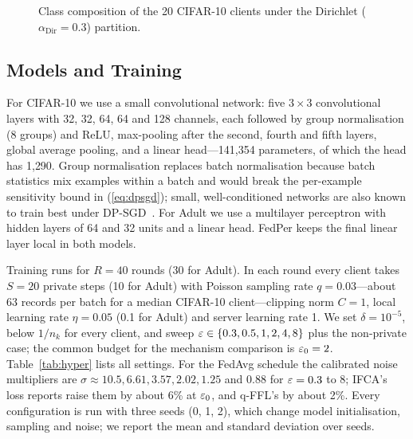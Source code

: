 \begin{table}[!t]
\caption{Datasets (sizes after cleaning; client size = records per client before the 70/10/20 split).}
\label{tab:datasets}
\centering
\footnotesize
{}
\end{table}

\begin{figure}[!t]
\centering
{}
\caption{Class composition of the 20 CIFAR-10 clients under the Dirichlet ($\alpha_{\mathrm{Dir}}=0.3$) partition.}
\label{fig:partition}
\end{figure}

\subsection{Models and Training}
For CIFAR-10 we use a small convolutional network: five $3\times3$ convolutional layers with 32, 32, 64, 64 and 128
channels, each followed by group normalisation (8 groups) and ReLU, max-pooling after the second, fourth and fifth
layers, global average pooling, and a linear head---141{,}354 parameters, of which the head has 1{,}290. Group
normalisation replaces batch normalisation because batch statistics mix examples within a batch and would break the
per-example sensitivity bound in (\ref{eq:dpsgd}); small, well-conditioned networks are also known to train best
under DP-SGD~\cite{tramer2021differentially}. For Adult we use a multilayer perceptron with hidden layers of 64 and
32 units and a linear head. FedPer keeps the final linear layer local in both models.

Training runs for $R=40$ rounds (30 for Adult). In each round every client takes $S=20$ private steps (10 for Adult)
with Poisson sampling rate $q=0.03$---about 63 records per batch for a median CIFAR-10 client---clipping norm $C=1$,
local learning rate $\eta=0.05$ (0.1 for Adult) and server learning rate 1. We set $\delta=10^{-5}$, below
$1/n_k$ for every client, and sweep $\varepsilon\in\{0.3,0.5,1,2,4,8\}$ plus the non-private case; the common budget for
the mechanism comparison is $\varepsilon_0=2$. Table~\ref{tab:hyper} lists all settings. For the
FedAvg schedule the calibrated noise multipliers are $\sigma\approx 10.5, 6.61, 3.57, 2.02, 1.25$ and $0.88$ for
$\varepsilon=0.3$ to $8$; IFCA's loss reports raise them by about 6\% at $\varepsilon_0$, and q-FFL's by about 2\%. Every
configuration is run with three seeds (0, 1, 2), which change model initialisation, sampling and noise; we report the
mean and standard deviation over seeds.

